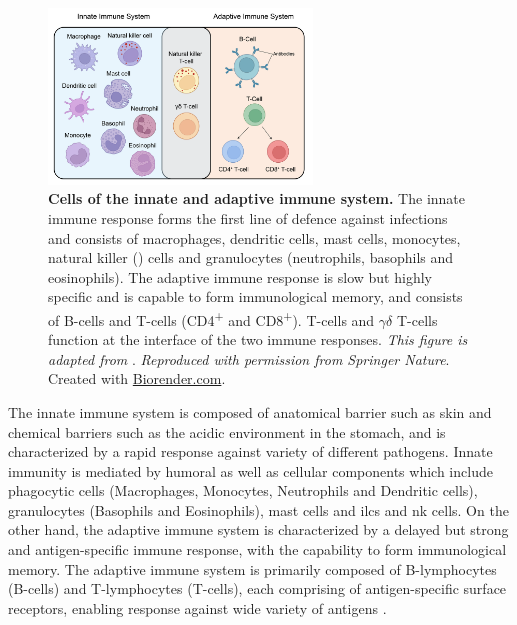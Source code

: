 


\begin{figure}
    \centering
    \vspace{-15pt}
    \includegraphics[width=7cm]{Chapter1/Fig/F1-15-01.png}
    \caption[Cells of the immune system]{\textbf{Cells of the innate and adaptive immune system.} The innate immune response forms the first line of defence against infections and consists of macrophages, dendritic cells, mast cells, monocytes, natural killer () cells and granulocytes (neutrophils, basophils and eosinophils). The adaptive immune response is slow but highly specific and is capable to form immunological memory, and consists of B-cells and T-cells (CD4\textsuperscript{+} and CD8\textsuperscript{+}).  T-cells and $\gamma\delta$ T-cells function at the interface of the two immune responses. \textit{This figure is adapted from} \textbf{\cite{dranoff_cytokines_2004}}.\textit{ Reproduced with permission from Springer Nature}. Created with \href{https://www.biorender.com/}{Biorender.com}.}
    \vspace{50pt}
    \label{fig:chp1_immunesystem}
\end{figure}


\par The innate immune system is composed of anatomical barrier such as skin and chemical barriers such as the acidic environment in the stomach, and is characterized by a rapid response against variety of different pathogens. Innate immunity is mediated by humoral as well as cellular components which include phagocytic cells (Macrophages, Monocytes, Neutrophils and Dendritic cells), granulocytes (Basophils and Eosinophils), mast cells and \glspl{ilc} and \gls{nk} cells. On the other hand, the adaptive immune system is characterized by a delayed but strong and antigen-specific immune response, with the capability to form immunological memory. The adaptive immune system is primarily composed of B-lymphocytes (B-cells) and T-lymphocytes (T-cells), each comprising of antigen-specific surface receptors, enabling response against wide variety of antigens \textbf{\cite{murphy_janeways_2017,chaplin_overview_2010,marshall_introduction_2018}}.\\



